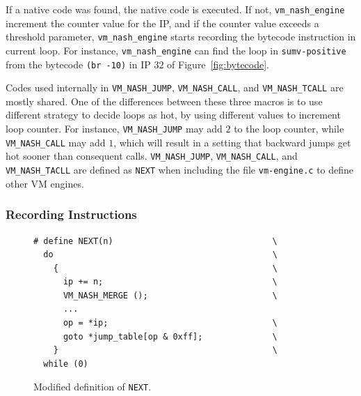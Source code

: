 \documentclass[preprint, 10pt]{sigplanconf}
\begin{document}
If a native code was found, the native code is executed. If not,
\texttt{vm\_nash\_engine} increment the counter value for the IP, and if the
counter value exceeds a threshold parameter, \texttt{vm\_nash\_engine} starts
recording the bytecode instruction in current loop. For instance,
\texttt{vm\_nash\_engine} can find the loop in \texttt{sumv-positive} from the
bytecode \texttt{(br~-10)} in IP $32$ of
Figure~\hyperref[fig:bytecode]{\ref{fig:bytecode}}.

Codes used internally in \texttt{VM\_NASH\_JUMP}, \texttt{VM\_NASH\_CALL}, and
\texttt{VM\_NASH\_TCALL} are mostly shared. One of the differences between these
three macros is to use different strategy to decide loops as hot, by using
different values to increment loop counter. For instance,
\texttt{VM\_NASH\_JUMP} may add $2$ to the loop counter, while
\texttt{VM\_NASH\_CALL} may add $1$, which will result in a setting that
backward jumps get hot sooner than consequent calls.  \texttt{VM\_NASH\_JUMP},
\texttt{VM\_NASH\_CALL}, and \texttt{VM\_NASH\_TACLL} are defined as
\texttt{NEXT} when including the file \texttt{vm-engine.c} to define other VM
engines.

\subsubsection{Recording Instructions}

\begin{figure}
  \centering
  \small
\begin{verbatim}
# define NEXT(n)                                \
  do                                            \
    {                                           \
      ip += n;                                  \
      VM_NASH_MERGE ();                         \
      ...
      op = *ip;                                 \
      goto *jump_table[op & 0xff];              \
    }                                           \
  while (0)
\end{verbatim}
\caption{Modified definition of \texttt{NEXT}.}
\label{fig:cnext}
\end{figure}
\end{document}
